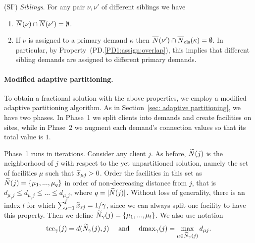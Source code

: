 \begin{description}
\begin{enumerate}
	\end{enumerate}
	
\item{(SI')} \emph{Siblings}. For any pair $\nu,\nu'$ of different siblings we have
  \begin{enumerate}

	\item \label{SI1:siblings disjoint}
		  ${\overline{N}}(\nu)\cap {\overline{N}}(\nu') = \emptyset$.
		
	\item \label{SI1:primary disjoint} If $\nu$ is assigned to a primary demand $\kappa$ then
 		${\overline{N}}(\nu')\cap {\overline{N}}_{\text{cls}}(\kappa) = \emptyset$. In particular, by Property~(PD.\ref{PD1:assign:overlap}),
		this implies that different sibling demands are assigned to different primary demands.

	\end{enumerate}
	
\end{description}


\paragraph{Modified adaptive partitioning.}
To obtain a fractional solution with the above properties,
we employ a modified adaptive partitioning algorithm. As
in Section~\ref{sec: adaptive partitioning}, we have two phases.
In Phase~1 we split clients into demands and create facilities on
sites, while in Phase~2 we augment each demand's
connection values so that its total value is $1$.

Phase~1 runs in iterations. Consider any client $j$.  As before,
${\widetilde N}(j)$ is the neighborhood of $j$ with respect to the yet
unpartitioned solution, namely the set of facilities $\mu$ such that
${\widetilde x}_{\mu j}>0$. Order the facilities in this set as
${\widetilde N}(j) = { \left\{ \mu_1,...,\mu_q \right\} }$ in order of non-decreasing
distance from $j$, that is
$d_{\mu_1 j} \leq d_{\mu_2 j} \leq \ldots \leq d_{\mu_q j}$, where
$q = |{\widetilde N}(j)|$. Without loss of generality, there is an index
$l$ for which $\sum_{s=1}^l {\widetilde x}_{s j} = 1/\gamma$, since we can
always split one facility to have this property. Then we define
${\widetilde N}_{\gamma}(j) = { \left\{ \mu_1,...,\mu_l \right\} }$. We also use notation
%
\begin{equation*}
\textrm{tcc}_\gamma(j) =  d({\widetilde N}_\gamma(j), j) 
			\quad\textrm{ and }\quad
 \text{dmax}_\gamma(j) = \max_{\mu \in {\widetilde N}_{\gamma}(j)} d_{\mu j}. 
\end{equation*}
%

